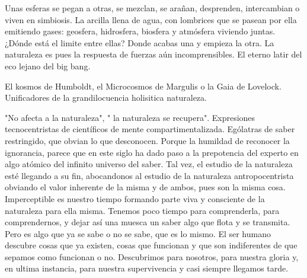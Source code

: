 \documentclass[ebook,11pt,oneside,openany]{memoir}
\begin{document}
Unas esferas se pegan a otras, se mezclan, se arañan, desprenden, intercambian o viven en simbiosis. La arcilla llena de agua, con lombrices que se pasean por ella emitiendo gases: geosfera, hidrosfera, biosfera y atmósfera viviendo juntas. ¿Dónde está el limite entre ellas? Donde acabas una y empieza la otra. La naturaleza es pues la respuesta de fuerzas aún incomprensibles. El eterno latir del eco lejano del big bang.

El kosmos de Humboldt, el Microcosmos de Margulis o la Gaia de Lovelock. Unificadores de la grandilocuencia holisitica naturaleza. 

"No afecta a la naturaleza", " la naturaleza se recupera". Expresiones tecnocentristas de científicos de mente compartimentalizada. Ególatras de saber restringido, que obvian lo que desconocen. Porque la humildad de reconocer la ignorancia, parece que en este siglo ha dado paso a la prepotencia del experto en algo atómico del infinito universo del saber. Tal vez, el estudio de la naturaleza esté llegando a su fin, abocandonos al estudio de la naturaleza antropocentrista obviando el valor inherente de la misma y de ambos, pues son la misma cosa. Imperceptible es nuestro tiempo formando parte viva y consciente de la naturaleza para ella misma. Tenemos poco tiempo para comprenderla, para comprendernos, y dejar así una muesca un saber algo que flota y se transmita. Pero es algo que ya se sabe o no se sabe, que es lo mismo. El ser humano descubre cosas que ya existen, cosas que funcionan y que son indiferentes de que sepamos como funcionan o no. Descubrimos para nosotros, para nuestra gloria y, en ultima instancia, para nuestra supervivencia y casi siempre llegamos tarde. 
\end{document}
